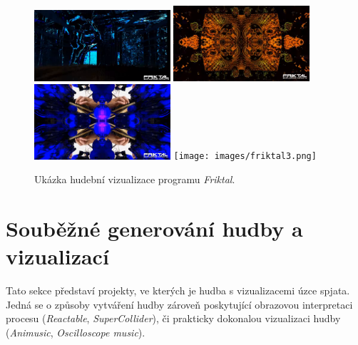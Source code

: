 \documentclass[thesis=B, czech]{FITthesis}[2019/03/06]
\begin{document}
\begin{figure}
    \centering
    \noindent
    \includegraphics[width=0.45\textwidth]{images/friktal0.png}\hspace{0.05\textwidth}%
    \includegraphics[width=0.45\textwidth]{images/friktal1.png}\\[1em]
    \includegraphics[width=0.45\textwidth]{images/friktal2.png}\hspace{0.05\textwidth}%
    \texttt{[image: images/friktal3.png]}\par
    \caption{Ukázka hudební vizualizace programu \textit{Friktal}.}
    \label{fig:friktal}
\end{figure}




\section{Souběžné generování hudby a vizualizací}

Tato sekce představí projekty, ve kterých je hudba s vizualizacemi úzce spjata. Jedná se o způsoby vytváření hudby zároveň poskytující obrazovou interpretaci procesu (\textit{Reactable}, \textit{SuperCollider}), či prakticky dokonalou vizualizaci hudby (\textit{Animusic}, \textit{Oscilloscope music}).

\end{document}
